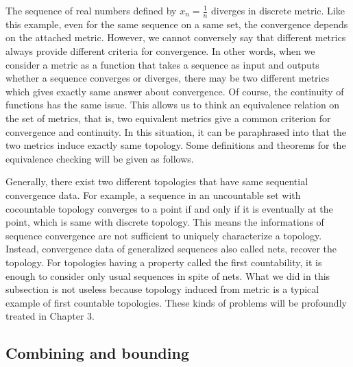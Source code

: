 \documentclass{../crs}
\begin{document}
The sequence of real numbers defined by $x_n=\frac1n$ diverges in discrete metric.
Like this example, even for the same sequence on a same set, the convergence depends on the attached metric.
However, we cannot conversely say that different metrics always provide different criteria for convergence.
In other words, when we consider a metric as a function that takes a sequence as input and outputs whether a sequence converges or diverges, there may be two different metrics which gives exactly same answer about convergence.
Of course, the continuity of functions has the same issue.
This allows us to think an equivalence relation on the set of metrics, that is, two equivalent metrics give a common criterion for convergence and continuity.
In this situation, it can be paraphrased into that the two metrics induce exactly same topology.
Some definitions and theorems for the equivalence checking will be given as follows.


\begin{rmk}
Generally, there exist two different topologies that have same sequential convergence data.
For example, a sequence in an uncountable set with cocountable topology converges to a point if and only if it is eventually at the point, which is same with discrete topology.
This means the informations of sequence convergence are not sufficient to uniquely characterize a topology.
Instead, convergence data of generalized sequences also called nets, recover the topology.
For topologies having a property called the first countability, it is enough to consider only usual sequences in spite of nets.
What we did in this subsection is not useless because topology induced from metric is a typical example of first countable topologies.
These kinds of problems will be profoundly treated in Chapter 3.
\end{rmk}


\subsection{Combining and bounding}





\end{document}
